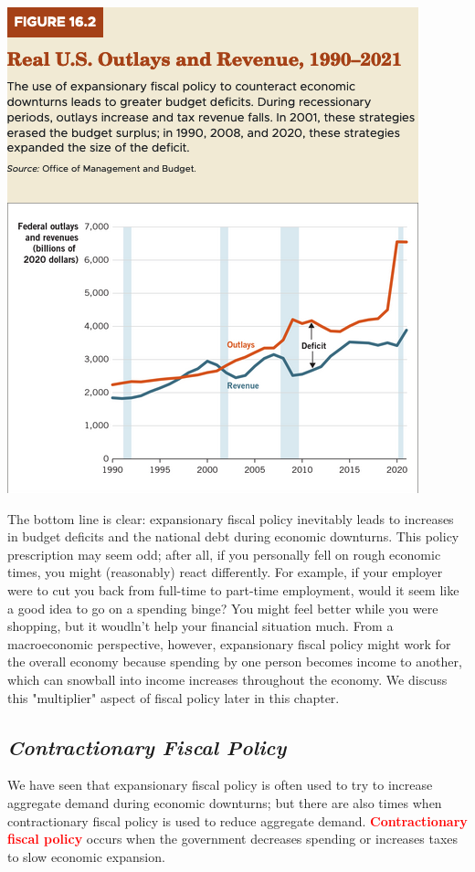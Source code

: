 \documentclass[11pt]{article} %
\begin{document}
\begin{center}
\includegraphics[scale=0.5]{images/Figure 16.2.png} 
\end{center}

The bottom line is clear: expansionary fiscal policy inevitably leads to increases in budget deficits and the national debt during economic downturns. This policy prescription may seem odd; after all, if you personally fell on rough economic times, you might (reasonably) react differently. For example, if your employer were to cut you back from full-time to part-time employment, would it seem like a good idea to go on a spending binge? You might feel better while you were shopping, but it woudln't help your financial situation much. From a macroeconomic perspective, however, expansionary fiscal policy might work for the overall economy because spending by one person becomes income to another, which can snowball into income increases throughout the economy. We discuss this "multiplier" aspect of fiscal policy later in this chapter.

\subsection*{\textbf{\textit{Contractionary Fiscal Policy}}}
We have seen that expansionary fiscal policy is often used to try to increase aggregate demand during economic downturns; but there are also times when contractionary fiscal policy is used to reduce aggregate demand. \textbf{\textcolor{red}{Contractionary fiscal policy}} occurs when the government decreases spending or increases taxes to slow economic expansion.
\end{document}
